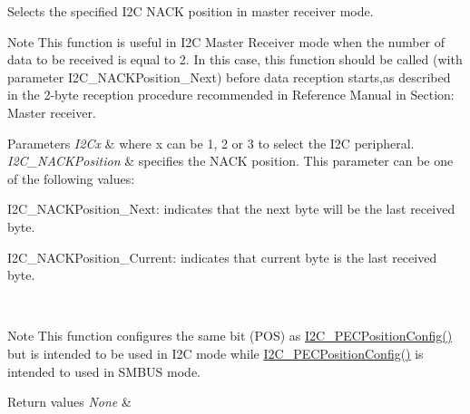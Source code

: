 Selects the specified I2C N\+A\+CK position in master receiver mode. 

\begin{DoxyNote}{Note}
This function is useful in I2C Master Receiver mode when the number of data to be received is equal to 2. In this case, this function should be called (with parameter I2\+C\+\_\+\+N\+A\+C\+K\+Position\+\_\+\+Next) before data reception starts,as described in the 2-\/byte reception procedure recommended in Reference Manual in Section\+: Master receiver. ~\newline

\end{DoxyNote}

\begin{DoxyParams}{Parameters}
{\em I2\+Cx} & where x can be 1, 2 or 3 to select the I2C peripheral. \\
\hline
{\em I2\+C\+\_\+\+N\+A\+C\+K\+Position} & specifies the N\+A\+CK position. This parameter can be one of the following values\+: \begin{DoxyItemize}
\item I2\+C\+\_\+\+N\+A\+C\+K\+Position\+\_\+\+Next\+: indicates that the next byte will be the last received byte. ~\newline
 \item I2\+C\+\_\+\+N\+A\+C\+K\+Position\+\_\+\+Current\+: indicates that current byte is the last received byte.\end{DoxyItemize}
\\
\hline
\end{DoxyParams}
\begin{DoxyNote}{Note}
This function configures the same bit (P\+OS) as \mbox{\hyperlink{group___i2_c___group3_ga5d0f939bdd45542502827bf408f24161}{I2\+C\+\_\+\+P\+E\+C\+Position\+Config()}} but is intended to be used in I2C mode while \mbox{\hyperlink{group___i2_c___group3_ga5d0f939bdd45542502827bf408f24161}{I2\+C\+\_\+\+P\+E\+C\+Position\+Config()}} is intended to used in S\+M\+B\+US mode.
\end{DoxyNote}

\begin{DoxyRetVals}{Return values}
{\em None} & \\
\hline
\end{DoxyRetVals}
\mbox{\label{group___i2_c_ga7be2cc634a613c8e3539137e897a22df}} 
